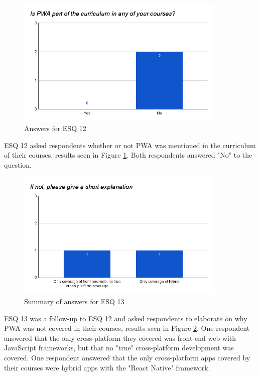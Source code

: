 \documentclass[a4paper,12pt]{article}
\begin{document}
\begin{figure}[ht!]
    \centering
    \includegraphics[width=10cm]{img/Results/esq12.png}
    \caption{Answers for ESQ 12}
    \label{fig:res_eduq12}
\end{figure}

\newpage
ESQ 12 asked respondents whether or not PWA was mentioned in the curriculum of their courses, results seen in Figure \ref{fig:res_eduq12}. Both respondents answered "No" to the question.

\begin{figure}[ht!]
    \centering
    \includegraphics[width=10cm]{img/Results/esq13.png}
    \caption{Summary of answers for ESQ 13}
    \label{fig:res_eduq13}
\end{figure}

ESQ 13 was a follow-up to ESQ 12 and asked respondents to elaborate on why PWA was not covered in their courses, results seen in Figure \ref{fig:res_eduq13}. One respondent answered that the only cross-platform they covered was front-end web with JavaScript frameworks, but that no "true" cross-platform development was covered. One respondent answered that the only cross-platform apps covered by their courses were hybrid apps with the "React Native" framework.
\end{document}
